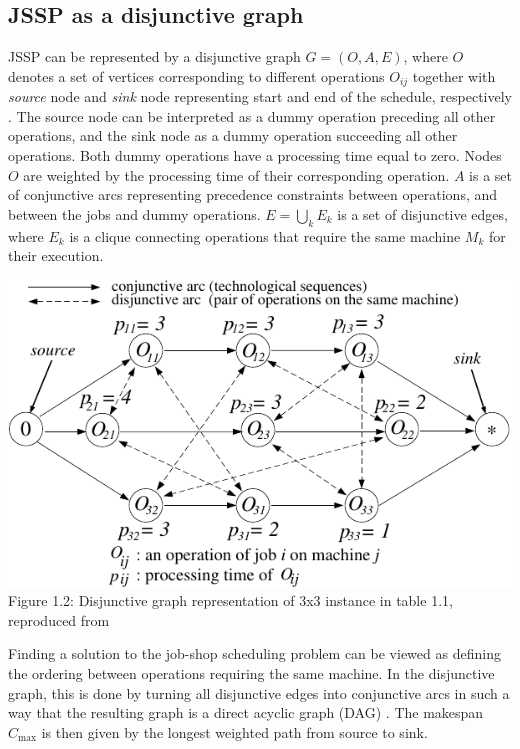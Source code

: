 \subsection{JSSP as a disjunctive graph} \label{JSSP as a disjunctive graph}

JSSP can be represented by a disjunctive graph $G = ( O, A, E )$, where $O$ denotes a set of vertices corresponding to different operations $O_{ij}$ together with \textit{source} node and \textit{sink} node representing start and end of the schedule, respectively \cite{YamadaNakanoJSSP, BLAZEWICZ2000317}. The source node can be interpreted as a dummy operation preceding all other operations, and the sink node as a dummy operation succeeding all other operations. Both dummy operations have a processing time equal to zero. Nodes $O$ are weighted by the processing time of their corresponding operation. $A$ is a set of conjunctive arcs representing precedence constraints between operations, and between the jobs and dummy operations. $E = \bigcup_{k} E_k$ is a set of disjunctive edges, where $E_k$ is a clique connecting operations that require the same machine $M_k$ for their execution.
\begin{center}
    \includegraphics[width=0.75\linewidth]{images/jssp_disjunctive_graph.pdf}\\
    Figure 1.2: Disjunctive graph representation of 3x3 instance in table 1.1, reproduced from \cite{YamadaNakanoJSSP}
\end{center}

Finding a solution to the job-shop scheduling problem can be viewed as defining the ordering between operations requiring the same machine. In the disjunctive graph, this is done by turning all disjunctive edges into conjunctive arcs \cite{YamadaNakanoJSSP, BLAZEWICZ2000317} in such a way that the resulting graph is a direct acyclic graph (DAG) \cite{doi:10.1287/opre.17.6.941}. The makespan $C_\text{max}$ is then given by the longest weighted path from source to sink.

